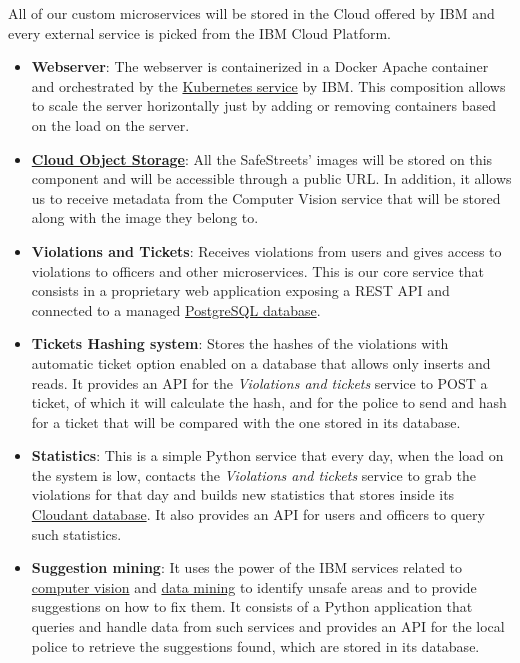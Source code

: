 All of our custom microservices will be stored in the Cloud offered by IBM and every external service is picked from the IBM Cloud Platform.
\begin{itemize}
	\item \textbf{Webserver}: The webserver is containerized in a Docker Apache container and orchestrated by the \hyperlink{kubernetes}{Kubernetes service} by IBM.
	This composition allows to scale the server horizontally just by adding or removing containers based on the load on the server.
	
	\item \hyperlink{cloudObjectStorage}{\textbf{Cloud Object Storage}}: All the SafeStreets' images will be stored on this component and will be accessible through a public URL. In addition, it allows us to receive metadata from the Computer Vision service that will be stored along with the image they belong to.
	
	\item \textbf{Violations and Tickets}: Receives violations from users and gives access to violations to officers and other microservices. This is our core service that consists in a proprietary web application exposing a REST API and connected to a managed \hyperlink{postgres}{PostgreSQL database}.
	
	\item \textbf{Tickets Hashing system}: Stores the hashes of the violations with automatic ticket option enabled on a database that allows only inserts and reads.
	It provides an API for the \textit{Violations and tickets} service to POST a ticket, of which it will calculate the hash, and for the police to send and hash for a ticket that will be compared with the one stored in its database.
	
	\item \textbf{Statistics}: This is a simple Python service that every day, when the load on the system is low, contacts the \textit{Violations and tickets} service to grab the violations for that day and builds new statistics that stores inside its \hyperlink{cloudant}{Cloudant database}.
	It also provides an API for users and officers to query such statistics.
	
	\item \textbf{Suggestion mining}: It uses the power of the IBM services related to \hyperlink{watson}{computer vision} and \hyperlink{discovery}{data mining} to identify unsafe areas and to provide suggestions on how to fix them. It consists of a Python application that queries and handle data from such services and provides an API for the local police to retrieve the suggestions found, which are stored in its database.
	

\end{itemize}
